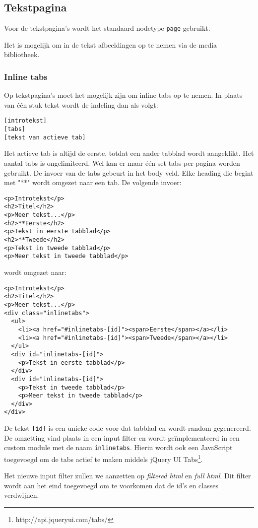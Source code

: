 \subsection{Tekstpagina}\label{tekstpagina}

Voor de tekstpagina's wordt het standaard nodetype \texttt{page} gebruikt.

Het is mogelijk om in de tekst afbeeldingen op te nemen via de media bibliotheek.

\subsubsection{Inline tabs}

Op tekstpagina's moet het mogelijk zijn om inline tabs op te nemen. In plaats van \'{e}\'{e}n stuk tekst wordt de indeling dan als volgt:
\begin{verbatim}
[introtekst]
[tabs]
[tekst van actieve tab]
\end{verbatim}
Het actieve tab is altijd de eerste, totdat een ander tabblad wordt aangeklikt. Het aantal tabs is ongelimiteerd. Wel kan er maar \'{e}\'{e}n set tabs per pagina worden gebruikt.
De invoer van de tabs gebeurt in het body veld. Elke heading die begint met "**" wordt omgezet naar een tab. De volgende invoer:
\begin{verbatim}
<p>Introtekst</p>
<h2>Titel</h2>
<p>Meer tekst...</p>
<h2>**Eerste</h2>
<p>Tekst in eerste tabblad</p>
<h2>**Tweede</h2>
<p>Tekst in tweede tabblad</p>
<p>Meer tekst in tweede tabblad</p>
\end{verbatim}
wordt omgezet naar:
\begin{verbatim}
<p>Introtekst</p>
<h2>Titel</h2>
<p>Meer tekst...</p>
<div class="inlinetabs">
  <ul>
    <li><a href="#inlinetabs-[id]"><span>Eerste</span></a></li>
    <li><a href="#inlinetabs-[id]"><span>Tweede</span></a></li>
  </ul>
  <div id="inlinetabs-[id]">
    <p>Tekst in eerste tabblad</p>
  </div>
  <div id="inlinetabs-[id]">
    <p>Tekst in tweede tabblad</p>
    <p>Meer tekst in tweede tabblad</p>
  </div>
</div>
\end{verbatim}
De tekst \texttt{[id]} is een unieke code voor dat tabblad en wordt random gegenereerd. De omzetting vind plaats in een input filter en wordt ge\"{i}mplementeerd in een custom module met de naam \texttt{inlinetabs}. Hierin wordt ook een JavaScript toegevoegd om de tabs actief te maken middels jQuery UI Tabs\footnote{http://api.jqueryui.com/tabs/}.

Het nieuwe input filter zullen we aanzetten op \emph{filtered html} en \emph{full html}. Dit filter wordt aan het eind toegevoegd om te voorkomen dat de id's en classes verdwijnen.

